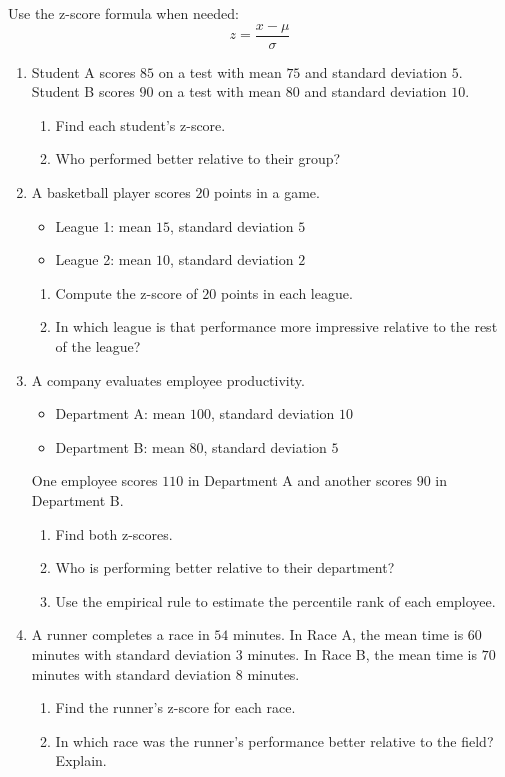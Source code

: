 \documentclass[11pt]{article}
\newcommand{\answerline}{\vspace{1.2cm}}
\newcommand{\biganswer}{\vspace{2cm}}
\begin{document}
Use the z-score formula when needed:
\[
z = \frac{x-\mu}{\sigma}
\]

\begin{enumerate}[leftmargin=*, label=\textbf{\arabic*.}, start=19]

\item Student A scores $85$ on a test with mean $75$ and standard deviation $5$. Student B scores $90$ on a test with mean $80$ and standard deviation $10$.
\begin{enumerate}[label=(\alph*)]
    \item Find each student's z-score. \answerline
    \item Who performed better relative to their group? \answerline
\end{enumerate}

\item A basketball player scores $20$ points in a game.
\begin{itemize}
    \item League 1: mean $15$, standard deviation $5$
    \item League 2: mean $10$, standard deviation $2$
\end{itemize}
\begin{enumerate}[label=(\alph*)]
    \item Compute the z-score of $20$ points in each league. \answerline
    \item In which league is that performance more impressive relative to the rest of the league? \answerline
\end{enumerate}

\item A company evaluates employee productivity.
\begin{itemize}
    \item Department A: mean $100$, standard deviation $10$
    \item Department B: mean $80$, standard deviation $5$
\end{itemize}
One employee scores $110$ in Department A and another scores $90$ in Department B.
\begin{enumerate}[label=(\alph*)]
    \item Find both z-scores. \answerline
    \item Who is performing better relative to their department? \answerline
    \item Use the empirical rule to estimate the percentile rank of each employee. \biganswer
\end{enumerate}

\item A runner completes a race in $54$ minutes. In Race A, the mean time is $60$ minutes with standard deviation $3$ minutes. In Race B, the mean time is $70$ minutes with standard deviation $8$ minutes.
\begin{enumerate}[label=(\alph*)]
    \item Find the runner's z-score for each race. \answerline
    \item In which race was the runner's performance better relative to the field? Explain. \biganswer
\end{enumerate}

\end{enumerate}
\end{document}

